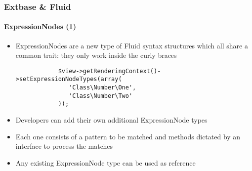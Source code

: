 
\begin{frame}[fragile]
	\frametitle{Extbase \& Fluid}
	\framesubtitle{ExpressionNodes (1)}

	\lstset{basicstyle=\smaller\ttfamily}

	\begin{itemize}

		\item ExpressionNodes are a new type of Fluid syntax structures which all
			share a common trait: they only work inside the curly braces

		\begin{lstlisting}
			$view->getRenderingContext()->setExpressionNodeTypes(array(
			   'Class\Number\One',
			   'Class\Number\Two'
			));
		\end{lstlisting}

		\item Developers can add their own additional ExpressionNode types

		\item Each one consists of a pattern to be matched and methods dictated
			by an interface to process the matches

		\item Any existing ExpressionNode type can be used as reference

	\end{itemize}

\end{frame}


